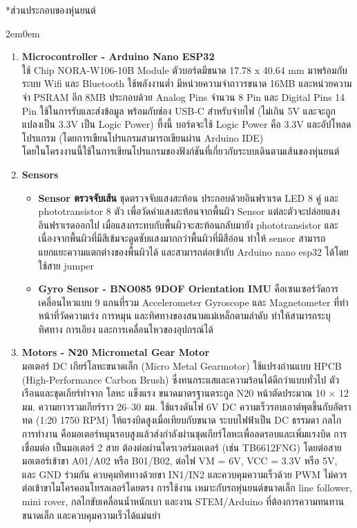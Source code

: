 \documentclass[14pt, fleqn, a4paper]{extarticle}
\makeatletter
\renewcommand\subsection{%
  \@ifstar{\flatsubsection}{\@subsection}%
}
\newcommand{\flatsubsection}[1]{%
   \par\medskip
   {\bfseries #1\par}
}
\makeatother
\begin{document}
\subsection*{ส่วนประกอบของหุ่นยนต์}
\begin{adjustwidth}{2em}{0em}
	\begin{enumerate}
		\item \textbf{Microcontroller - Arduino Nano ESP32} \\
			\indent ใช้ Chip NORA-W106-10B Module ตัวบอร์ดมีขนาด 17.78 x 40.64 mm มาพร้อมกับระบบ Wifi และ Bluetooth ใช้พลังงานต่ำ มีหน่วยความจำถาวรขนาด 16MB และหน่วยความจำ PSRAM อีก 8MB ประกอบด้วย Analog Pins จำนวน 8 Pin และ Digital Pins 14 Pin ใช้ในการรับและส่งข้อมูล พร้อมกับช่อง USB-C สำหรับจ่ายไฟ (ไม่เกิน 5V และจะถูกแปลงเป็น 3.3V เป็น Logic Power) ที้งนี้ บอร์ดจะใช้ Logic Power คือ 3.3V และอัปโหลดโปรแกรม (โดยการเขียนโปรแกรมสามารถเขียนผ่าน Arduino IDE) \\
			โดยในโครงงานนี้ใช้ในการเขียนโปรแกรมของฟังก์ชันที่เกี่ยวกับระบบเดินตามเส้นของหุ่นยนต์
		\item \textbf{Sensors}
			 \begin{itemize}
				\item \textbf{Sensor ตรวจจับเส้น} ชุดตรวจจับแสงสะท้อน ประกอบด้วยอินฟราเรด LED 8 คู่ และ phototransistor 8 ตัว เพื่อวัดค่าแสงสะท้อนจากพื้นผิว Sensor แต่ละตัวจะปล่อยแสงอินฟราเรดออกไป เมื่อแสงกระทบกับพื้นผิวจะสะท้อนกลับมายัง phototransistor และ เนื่องจากพื้นผิวที่มีสีเข้มจะดูดซับแสงมากกว่าพื้นผิวที่มีสีอ่อน ทำให้ sensor สามารถแยกแยะความแตกต่างของพื้นผิวได้ และสามารถต่อเข้ากับ Arduino nano esp32 ได้โดยใช้สาย jumper
				\item \textbf{Gyro Sensor - BNO085 9DOF Orientation IMU} คือเซนเซอร์วัดการเคลื่อนไหวแบบ 9 แกนที่รวม Accelerometer Gyroscope และ Magnetometer ที่ทำหน้าที่วัดความเร่ง การหมุน และทิศทางของสนามแม่เหล็กตามลำดับ ทำให้สามารถระบุทิศทาง การเอียง และการเคลื่อนไหวของอุปกรณ์ได้
			\end{itemize}
		\item \textbf{Motors - N20 Micrometal Gear Motor} \\
			\indent มอเตอร์ DC เกียร์โลหะขนาดเล็ก (Micro Metal Gearmotor) ใช้แปรงถ่านแบบ HPCB (High-Performance Carbon Brush) ซึ่งทนกระแสและความร้อนได้ดีกว่าแบบทั่วไป ตัวเรือนและชุดเกียร์ทำจาก โลหะ แข็งแรง ขนาดมาตรฐานตระกูล N20 หน้าตัดประมาณ 10 × 12 มม. ความยาวรวมเกียร์ราว 26–30 มม. ใช้แรงดันไฟ 6V DC ความเร็วรอบเอาต์พุตขึ้นกับอัตราทด (1:20 1750 RPM) ให้แรงบิดสูงเมื่อเทียบกับขนาด ระบบไฟฟ้าเป็น DC ธรรมดา กลไกการทำงาน คือมอเตอร์หมุนรอบสูงแล้วส่งกำลังผ่านชุดเกียร์โลหะเพื่อลดรอบและเพิ่มแรงบิด การเชื่อมต่อ เป็นมอเตอร์ 2 สาย ต้องต่อผ่านไดรเวอร์มอเตอร์ (เช่น TB6612FNG) โดยต่อสายมอเตอร์เข้าขา A01/A02 หรือ B01/B02, ต่อไฟ VM = 6V, VCC = 3.3V หรือ 5V, และ GND ร่วมกัน ควบคุมทิศทางด้วยขา IN1/IN2 และควบคุมความเร็วด้วย PWM ไม่ควรต่อเข้าขาไมโครคอนโทรลเลอร์โดยตรง การใช้งาน เหมาะกับรถหุ่นยนต์ขนาดเล็ก line follower, mini rover, กลไกขับเคลื่อนน้ำหนักเบา และงาน STEM/Arduino ที่ต้องการความทนทาน ขนาดเล็ก และควบคุมความเร็วได้แม่นยำ

\end{enumerate}
\end{adjustwidth}
\end{document}
